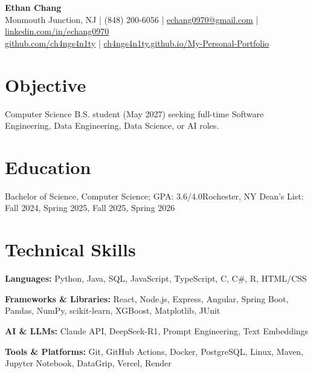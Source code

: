 \newenvironment{highlights}
  {\begin{itemize}[leftmargin=1.3em, label=\textbullet, itemsep=0pt,
                   parsep=0pt, topsep=1pt, after=\vspace{2pt}]}
  {\end{itemize}}

\newcommand{\cat}[2]{\textbf{#1:} #2\par}



\begin{center}
  {\fontsize{22}{26}\selectfont\bfseries Ethan Chang}\\[4pt]
  Monmouth Junction, NJ \enspace|\enspace
  (848) 200-6056 \enspace|\enspace
  \href{mailto:echang0970@gmail.com}{echang0970@gmail.com} \enspace|\enspace
  \href{https://www.linkedin.com/in/echang0970}{linkedin.com/in/echang0970}\\
  \href{https://github.com/ch4ngs4n1ty}{github.com/ch4ngs4n1ty} \enspace|\enspace
  \href{https://ch4ngs4n1ty.github.io/My-Personal-Portfolio}{ch4ngs4n1ty.github.io/My-Personal-Portfolio}
\end{center}
\vspace{-9pt}

\section{Objective}
Computer Science B.S. student (May 2027) seeking full-time Software Engineering, Data Engineering, Data Science, or AI roles.

\section{Education}
      {Bachelor of Science, Computer Science; GPA: 3.6/4.0}{Rochester, NY}
Dean's List: Fall 2024, Spring 2025, Fall 2025, Spring 2026

\section{Technical Skills}
\cat{Languages}{Python, Java, SQL, JavaScript, TypeScript, C, C\#, R, HTML/CSS}
\cat{Frameworks \& Libraries}{React, Node.js, Express, Angular, Spring Boot, Pandas, NumPy, scikit-learn, XGBoost, Matplotlib, JUnit}
\cat{AI \& LLMs}{Claude API, DeepSeek-R1, Prompt Engineering, Text Embeddings}
\cat{Tools \& Platforms}{Git, GitHub Actions, Docker, PostgreSQL, Linux, Maven, Jupyter Notebook, DataGrip, Vercel, Render}


